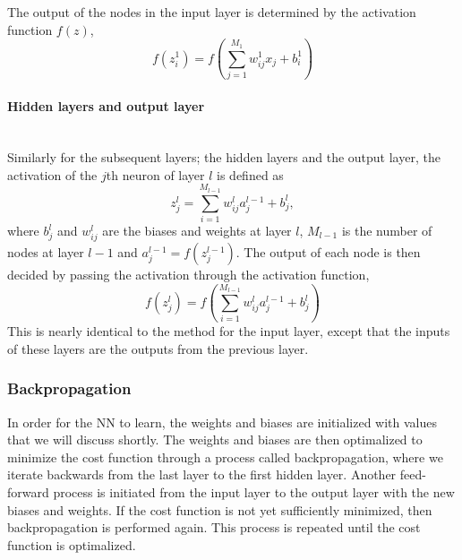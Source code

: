 \documentclass[a4paper, 11pt, twocolumn]{article}
\newcommand{\myparagraph}[1]{\paragraph{#1}\mbox{}\\}
\begin{document}
The output of the nodes in the input layer is determined by the activation
function $f(z)$,
\begin{equation}
f(z_i^1) = f \left( \sum^{M_1}_{j=1}w_{ij}^1x_j + b_i^1 \right)
\end{equation}
\myparagraph{Hidden layers and output layer}
Similarly for the subsequent layers; the hidden layers and the output layer, the
activation of the $j$th neuron of layer $l$ is defined as
\begin{equation}
z_j^l = \sum_{i=1}^{M_{l-1}} w_{ij}^la_j^{l-1} + b_j^l,
\end{equation}
where $b_j^l$ and $w_{ij}^l$ are the biases and weights at layer $l$, ${M_{l-1}}$
is the number of nodes at layer $l-1$ and $a_j^{l-1}=f(z_j^{l-1}) $.
The output of each node is then decided by passing the activation through the
activation function,
\begin{equation}
 f(z_j^l) =f \left(     \sum_{i=1}^{M_{l-1}} w_{ij}^la_j^{l-1} + b_j^l \right)
\end{equation}
This is nearly identical to the method for the input layer, except that the
inputs of these layers are the outputs from the previous layer.

\subsubsection{Backpropagation} \label{subsub:backpropagation}
In order for the NN to learn, the weights and biases are initialized with values
that we will discuss shortly. The weights and biases are then optimalized to
minimize the cost function through a process called backpropagation, where we
iterate backwards from the last layer to the first hidden layer. Another feed-forward process is initiated  from the input layer to the output layer with the new
biases and weights. If the cost function is not yet sufficiently minimized, then
backpropagation is performed again. This process is repeated until the cost
function is optimalized.
\end{document}

